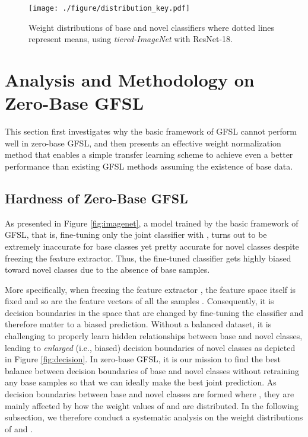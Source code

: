 
\begin{figure}[t]
	\centering
	\texttt{[image: ./figure/distribution\_key.pdf]}
\caption{Weight distributions of base and novel classifiers where dotted lines represent means, using \textit{tiered-ImageNet} with ResNet-18.}
	\label{fig:shifting}
	\vspace{-2mm}
\end{figure}

\section{Analysis and Methodology on Zero-Base GFSL} \label{sec:anaylsis}

This section first investigates why the basic framework of GFSL cannot perform well in zero-base GFSL, and then presents an effective weight normalization method that enables a simple transfer learning scheme to achieve even a better performance than existing GFSL methods assuming the existence of base data.

\subsection{Hardness of Zero-Base GFSL}
As presented in Figure \ref{fig:imagenet}, a model trained by the basic framework of GFSL, that is, fine-tuning only the joint classifier  with , turns out to be extremely inaccurate for base classes yet pretty accurate for novel classes despite freezing the feature extractor. Thus, the fine-tuned classifier gets highly biased toward novel classes due to the absence of base samples. 

More specifically, when freezing the feature extractor , the feature space itself is fixed and so are the feature vectors  of all the samples . Consequently, it is 
decision boundaries in the space that are changed by fine-tuning the classifier and therefore matter to a biased prediction. Without a balanced dataset, it is challenging to properly learn hidden relationships between base and novel classes, leading to \textit{enlarged} (i.e., biased) decision boundaries of novel classes as depicted in Figure \ref{fig:decision}. In zero-base GFSL, it is our mission to find the best balance between decision boundaries of base and novel classes without retraining any base samples so that we can ideally make the best joint prediction. As decision boundaries between base and novel classes are formed where , they are mainly affected by how the weight values of  and  are distributed. In the following subsection, we therefore conduct a systematic analysis on the weight distributions of  and .

